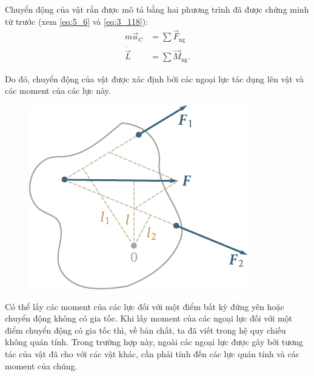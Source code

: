 Chuyển động của vật rắn được mô tả bằng hai phương trình đã được chứng minh từ trước (xem \eqref{eq:5_6} và \eqref{eq:3_118}):
\begin{align*}
	m\vec{a}_{\text{C}} &= \sum\vec{F}_{\text{ng}}\\
	\dot{\vec{L}} &= \sum\vec{M}_{\text{ng}}.
\end{align*}

\noindent
Do đó, chuyển động của vật được xác định bởi các ngoại lực tác dụng lên vật và các moment của các lực này.


\begin{figure}[!htb]
	\begin{center}
		\includegraphics[scale=0.95]{figures/ch_05/fig_5_20.pdf}
		\caption[]{}
		\label{fig:5_20}
	\end{center}
\end{figure}

Có thể lấy các moment của các lực đối với một điểm bất kỳ đứng yên hoặc chuyển động không có gia tốc. Khi lấy moment của các ngoại lực đối với một điểm chuyển động có gia tốc thì, về bản chất, ta đã viết  trong hệ quy chiếu không quán tính. Trong trường hợp này, ngoài các ngoại lực được gây bởi tương tác của vật đã cho với các vật khác, cần phải tính đến các lực quán tính và các moment của chúng.

